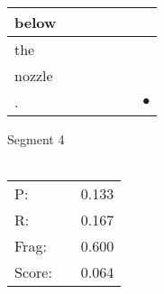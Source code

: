 \documentclass[landscape]{article}
\newcommand{\ssp}{\hspace{2pt}}
\newcommand{\mex}{\cellcolor{g}$\bullet$}
\begin{document}
\begin{tabular}{|l|p{10pt}|p{10pt}|p{10pt}|p{10pt}|p{10pt}|p{10pt}|}
\hline
\ssp below \ssp&\hspace{2pt}&\hspace{2pt}&\hspace{2pt}&\hspace{2pt}&\hspace{2pt}&\hspace{2pt}\\
\hline
\ssp the \ssp&\hspace{2pt}&\hspace{2pt}&\hspace{2pt}&\hspace{2pt}&\hspace{2pt}&\hspace{2pt}\\
\hline
\ssp nozzle \ssp&\hspace{2pt}&\hspace{2pt}&\hspace{2pt}&\hspace{2pt}&\hspace{2pt}&\hspace{2pt}\\
\hline
\ssp \cellcolor{ref5}. \ssp&\hspace{2pt}&\hspace{2pt}&\hspace{2pt}&\hspace{2pt}&\hspace{2pt}&\hspace{2pt}\mex\\
\hline
\end{tabular}

\vspace{6pt}
\noindent Segment 4\\\\
\noindent\begin{tabular}{lm{12pt}r}
\hline
P:&&0.133\\
R:&&0.167\\
Frag:&&0.600\\
Score:&&0.064\\
\end{tabular}

\newpage
\end{document}
